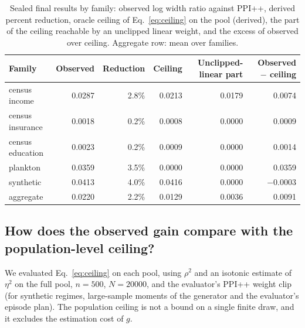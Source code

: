 \documentclass{article}
\begin{document}
\begin{table}[t]
\centering
\caption{Sealed final results by family: observed log width ratio against PPI++, derived percent reduction, oracle ceiling of Eq.~\eqref{eq:ceiling} on the pool (derived), the part of the ceiling reachable by an unclipped linear weight, and the excess of observed over ceiling. Aggregate row: mean over families.}
\label{tab:final}
\small
\begin{tabular}{lrrrrr}
\toprule
Family & Observed & Reduction & Ceiling & Unclipped-linear part & Observed $-$ ceiling \\
\midrule
census income & 0.0287 & 2.8\% & 0.0213 & 0.0179 & 0.0074 \\
census insurance & 0.0018 & 0.2\% & 0.0008 & 0.0000 & 0.0009 \\
census education & 0.0023 & 0.2\% & 0.0009 & 0.0000 & 0.0014 \\
plankton & 0.0359 & 3.5\% & 0.0000 & 0.0000 & 0.0359 \\
synthetic & 0.0413 & 4.0\% & 0.0416 & 0.0000 & $-$0.0003 \\
\midrule
aggregate & 0.0220 & 2.2\% & 0.0129 & 0.0036 & 0.0091 \\
\bottomrule
\end{tabular}
\end{table}

\subsection{How does the observed gain compare with the population-level ceiling?}\label{sec:headroomcheck}
We evaluated Eq.~\eqref{eq:ceiling} on each pool, using $\rho^2$ and an isotonic estimate of $\eta^2$ on the full pool, $n=500$, $N=20000$, and the evaluator's PPI++ weight clip (for synthetic regimes, large-sample moments of the generator and the evaluator's episode plan). The population ceiling is not a bound on a single finite draw, and it excludes the estimation cost of $g$.
\end{document}
